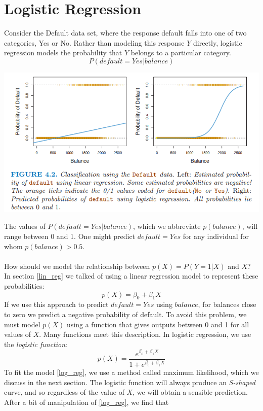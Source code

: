 \section{Logistic Regression}
Consider the Default data set, where the response default falls into
one of two categories, Yes or No. Rather than modeling this response $Y$
directly, logistic regression models the probability that $Y$ belongs to a particular category.
\[P(default = Yes | balance)\]
\begin{center}
    \includegraphics[scale=0.8]{images/logistic_reg.png}
\end{center}
The values of $P(default = Yes|balance)$, which we abbreviate $p(balance)$, will range between 0 and 1. One might predict $default = Yes$ for any individual for whom $p(balance) > 0.5$.\\\\
How should we model the relationship between $p(X) = P(Y = 1|X)$ and $X$? In section \ref{lin_reg} we talked of using a linear regression model to represent
these probabilities:
\[p(X) = \beta_0 + \beta_1X\]
If we use this approach to predict $default=Yes$ using $balance$, for balances close to zero we predict a negative probability of default. To avoid this problem, we must model $p(X)$ using a function that gives outputs between 0 and 1 for all values of $X$. Many functions meet this description. In logistic regression, we use the \textit{logistic function}:
\begin{equation}
    p(X) = \frac{e^{\beta_0 + \beta_1X}}{1 + e^{\beta_0 + \beta_1X}}
    \label{log_reg}
\end{equation}
To fit the model \ref{log_reg}, we use a method called maximum likelihood, which we discuss in the next section. The logistic function will always produce
an \textit{S-shaped} curve, and so regardless of the value of $X$, we will obtain a sensible prediction. After a bit of manipulation of \ref{log_reg}, we find that
